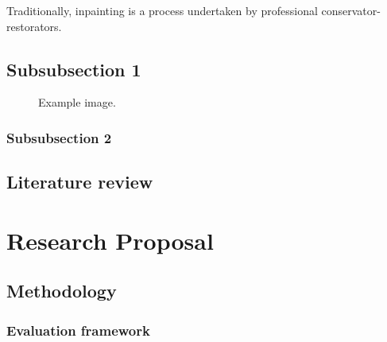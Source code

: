 \documentclass[11pt]{article} %
\theoremstyle{plain}
\theoremstyle{definition}
\theoremstyle{remark}
\begin{document}
Traditionally, inpainting is a process undertaken by professional conservator-restorators.

\subsection{Subsubsection 1} %


\begin{figure}[H] %
\caption{Example image.}
\label{fig:speciation}
\end{figure}


\subsubsection{Subsubsection 2} %


\subsection{Literature review}


\section{Research Proposal} %



\subsection{Methodology} %

\subsubsection{Evaluation framework} %
\end{document}
